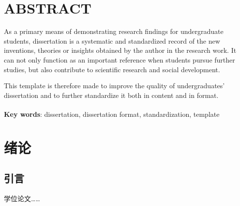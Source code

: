 \documentclass[UTF8,a4paper,12pt]{ctexart}
\numberwithin{equation}{section}
\begin{document}


\newpage
{}
\section*{ABSTRACT}

\hspace{8mm}As a primary means of demonstrating research findings for undergraduate students, dissertation is a systematic and standardized record of the new inventions, theories or insights obtained by the author in the research work. It can not only function as an important reference when students pursue further studies, but also contribute to scientific research and social development.\par 
This template is therefore made to improve the quality of undergraduates’ dissertation and to further standardize it both in content and in format.\\
~\\ 
\textbf{Key words}: dissertation, dissertation format, standardization, template




\newpage
\renewcommand\contentsname{\textbf{目\quad 录}}
\begin{center}
{\tableofcontents
\thispagestyle{fancy}
}
\end{center}




\newpage
{}
\section{绪论}
\subsection{引言}
学位论文……
\end{document}
